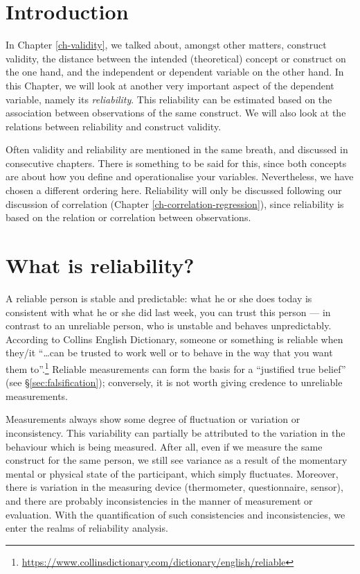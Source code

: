 \documentclass[
]{book}
\begin{document}
\section{Introduction}\label{introduction-6}

In Chapter \ref{ch-validity}, we talked about, amongst other matters,
construct validity, the distance between the intended (theoretical)
concept or construct on the one hand, and the independent or dependent variable
on the other hand. In this Chapter, we will look at another very important
aspect of the dependent variable, namely its \emph{reliability}.
This reliability can be estimated based on the
association between observations of the same construct.
We will also look at the relations between reliability and construct validity.

Often validity and reliability are mentioned in the same breath, and discussed in consecutive
chapters. There is something to be said for this, since both concepts are about how you define and
operationalise your variables. Nevertheless, we have chosen a different ordering here. Reliability
will only be discussed following our discussion of correlation (Chapter
\ref{ch-correlation-regression}), since reliability is based on the relation or correlation
between observations.

\section{What is reliability?}\label{what-is-reliability}

A reliable person is stable and predictable: what he or she does
today is consistent with what he or she did last week, you can trust
this person --- in contrast to an unreliable person, who
is unstable and behaves unpredictably. According to Collins English Dictionary, someone or something is reliable when they/it ``\ldots can be trusted to work well or to behave in the way that you want them to''.\footnote{\url{https://www.collinsdictionary.com/dictionary/english/reliable}}
Reliable measurements can form the basis for a
``justified true belief'' (see
§\ref{sec:falsification}); conversely, it is not worth
giving credence to unreliable measurements.

Measurements always show some degree of fluctuation or variation or
inconsistency. This variability can partially be attributed to the
variation in the behaviour which is being measured. After all, even if we
measure the same construct for the same person, we still see variance
as a result of the momentary mental or physical state of the participant,
which simply fluctuates. Moreover, there is variation in the measuring device
(thermometer, questionnaire, sensor), and there are probably inconsistencies in the manner
of measurement or evaluation. With the quantification of such consistencies and
inconsistencies, we enter the realms of reliability analysis.
\end{document}
